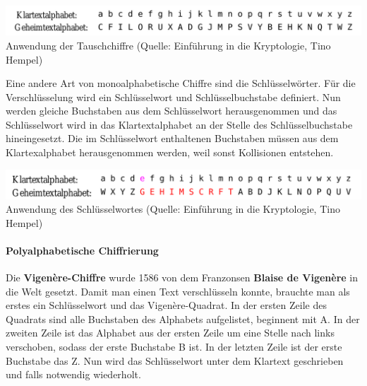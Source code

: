 \documentclass[12pt,a4paper]{report}
\begin{document}
\begin{center}
\includegraphics[scale=0.35]{img/tauschchiffre.png}\\
Anwendung der Tauschchiffre (Quelle: Einführung in die Kryptologie, Tino Hempel)
\end{center}

Eine andere Art von monoalphabetische Chiffre sind die Schlüsselwörter. Für die Verschlüsselung wird ein Schlüsselwort und Schlüsselbuchstabe definiert. Nun werden gleiche Buchstaben aus dem Schlüsselwort herausgenommen und das Schlüsselwort wird in das Klartextalphabet an der Stelle des Schlüsselbuchstabe hineingesetzt. Die im Schlüsselwort enthaltenen Buchstaben müssen aus dem Klartexalphabet herausgenommen werden, weil sonst Kollisionen entstehen.

\begin{center}
\includegraphics[scale=0.38]{img/schluesselwortes.png}\\
Anwendung des Schlüsselwortes (Quelle: Einführung in die Kryptologie, Tino Hempel)
\end{center}

\newpage
\paragraph{Polyalphabetische Chiffrierung}

Die \textbf{Vigenère-Chiffre} wurde 1586 von dem Franzonsen \textbf{Blaise de Vigenère} in die Welt gesetzt. Damit man einen Text verschlüsseln konnte, brauchte man als erstes ein Schlüsselwort und das Vigenère-Quadrat. In der ersten Zeile des Quadrats sind alle Buchstaben des Alphabets aufgelistet, beginnent mit A. In der zweiten Zeile ist das Alphabet aus der ersten Zeile um eine Stelle nach links verschoben, sodass der erste Buchstabe B ist. In der letzten Zeile ist der erste Buchstabe das Z. Nun wird das Schlüsselwort unter dem Klartext geschrieben und falls notwendig wiederholt.\\
\end{document}
